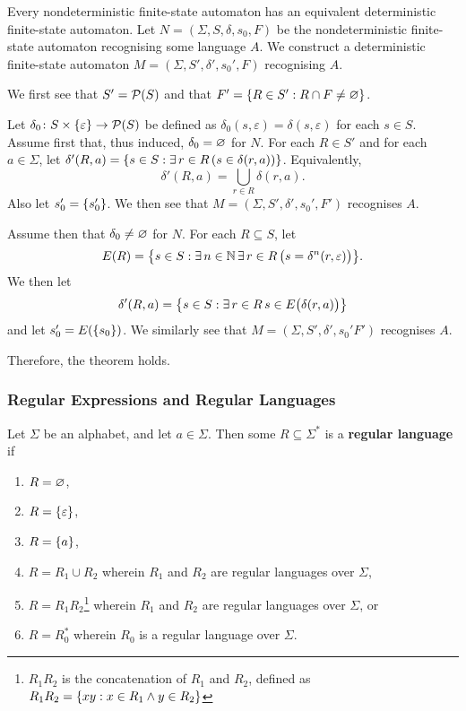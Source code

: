 \Bth
    Every nondeterministic finite-state automaton has an equivalent
    deterministic finite-state automaton.
\Eth
\Bpr
    Let \(N = (\varSigma, S, \delta, s_0, F)\) be the nondeterministic
    finite-state automaton recognising some language \(A\). We construct a
    deterministic finite-state automaton \(M = (\varSigma, S', \delta', s_0',
    F)\) recognising \(A\).

    We first see that \(S' = \pow(S)\) and that \(F' = \set{R \in S' : R \cap F
    \neq \nset}\).

    Let \(\map{\delta_0}{S \times \set{\varepsilon}}{\pow(S)}\) be defined as
    \(\delta_0(s, \varepsilon) = \delta(s, \varepsilon)\) for each \(s \in S\).
    Assume first that, thus induced, \(\delta_0 = \nset\) for \(N\). For each
    \(R \in S'\) and for each \(a \in \varSigma\), let \(\delta'(R, a) = \set{s
    \in S : \exists \, r \in R \, (s \in \delta(r, a))}\). Equivalently,
    \[
        \delta'(R, a) = \bigcup_{r \in R} \delta(r, a).
    \]
    Also let \(s_0' = \set{s_0'}\). We then see that \(M = (\varSigma, S',
    \delta', s_0', F')\) recognises \(A\).

    Assume then that \(\delta_0 \neq \nset\) for \(N\). For each \(R \subseteq S
    \), let
    \[
        E(R) = \set*{s \in S : \exists \, n \in \setnat \, \exists \, r \in R \,
        \big(s = \delta^n(r, \varepsilon)\big)}.
    \]
    We then let
    \[
        \delta'(R, a) = \set*{s \in S : \exists \, r \in R \, s \in
        E\big(\delta(r, a)\big)}
    \]
    and let \(s_0' = E(\set{s_0})\). We similarly see that \(M = (\varSigma, S',
    \delta', s_0' F')\) recognises \(A\).

    Therefore, the theorem holds.
\Epr

\subsubsection{Regular Expressions and Regular Languages}

\Bdf
    Let \(\varSigma\) be an alphabet, and let \(a \in \varSigma\). Then some \(R
    \subseteq \varSigma^*\) is a {\bf regular language} if
    \begin{enumerate}
        \item \(R = \nset\),
        \item \(R = \set{\varepsilon}\),
        \item \(R = \set{a}\),
        \item \(R = R_1 \cup R_2\) wherein \(R_1\) and \(R_2\) are regular
        languages over \(\varSigma\),
        \item \(R = R_1 R_2\)\footnote{\(R_1 R_2\) is the concatenation of
        \(R_1\) and \(R_2\), defined as \(R_1 R_2 = \set{x y : x \in R_1 \land y
        \in R_2}\)} wherein \(R_1\) and \(R_2\) are regular languages over
        \(\varSigma\), or
        \item \(R = R_0^*\) wherein \(R_0\) is a regular language over
        \(\varSigma\).
    \end{enumerate}
\Edf

